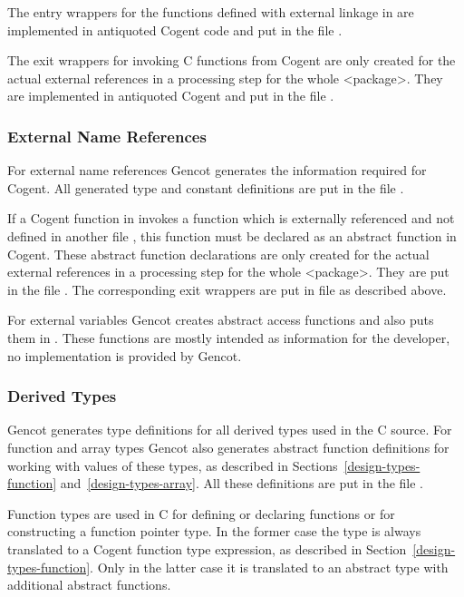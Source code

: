 The entry wrappers for the functions defined with external linkage in  are implemented in antiquoted Cogent code and
put in the file . 

The exit wrappers for invoking C functions from Cogent are only created for the actual
external references in a processing step for the whole <package>. They are implemented in antiquoted Cogent
and put in the file .

\subsubsection{External Name References}

For external name references Gencot generates the information required for Cogent. 
All generated type and constant definitions are put in the file .

If a Cogent function in  invokes a function which is externally referenced and not defined in another
file , this function must be declared as an abstract function in Cogent. These abstract function declarations
are only created for the actual
external references in a processing step for the whole <package>. They are put in the file .
The corresponding exit wrappers are put in file  as described above.

For external variables Gencot creates abstract access functions and also puts them in .
These functions are mostly intended as information for the developer, no implementation is provided by Gencot.

\subsubsection{Derived Types}

Gencot generates type definitions for all derived types used in the C source. 
For function and array types Gencot also generates abstract function definitions for working with
values of these types, as described in Sections~\ref{design-types-function} and~\ref{design-types-array}.
All these definitions are put in the file .

Function types are used in C for defining or declaring functions or for constructing a function pointer 
type. In the former case the type is always translated to a Cogent function type expression, as described
in Section~\ref{design-types-function}. Only in the latter case it is translated to an abstract type
with additional abstract functions.

